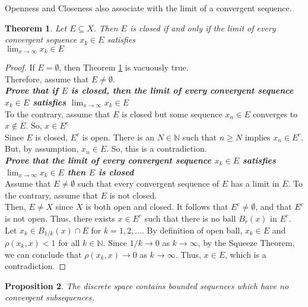 \documentclass[12pt, reqno]{amsart}
\newtheorem{theorem}{Theorem}[section]
\newtheorem{proposition}[theorem]{Proposition}
\theoremstyle{definition}
\numberwithin{equation}{section}
\newcommand{\dN}{{\mathbb N}}
\newcommand{\tab}{\hspace{1cm}}
\begin{document}
Openness and Closeness also associate with the limit of a convergent sequence.
\begin{theorem} \cite{s1}
    Let $E \subseteq X$. Then $E$ is closed if and only if the limit of every convergent sequence $x_k \in E$ satisfies\\
    \hspace*{5cm} $\lim_{x \to \infty} x_k \in E$ \label{limit_theorem}
\end{theorem}
\begin{proof}
    If $E = \emptyset$, then Theorem \ref{limit_theorem} is vacuously true.\\
    Therefore, assume that $E \neq \emptyset$.\\
    \textbf{ \textit{Prove that if $E$ is closed, then the limit of every convergent sequence $x_k \in E$ satisfies $\lim_{x \to \infty} x_k \in E$}}\\
    \tab To the contrary, assume that $E$ is closed but some sequence $x_n \in E$ converges to $x \notin E$. So, $x \in E^c$\\
    \tab Since $E$ is closed, $E^c$ is open. There is an $N \in \dN$ such that $n \geq N$ implies $x_n \in E^c$. But, by assumption, $x_n \in E$. So, this is a contradiction.\\
    \textbf{ \textit{Prove that the limit of every convergent sequence $x_k \in E$ satisfies $\lim_{x \to \infty} x_k \in E$ then $E$ is closed}}\\
    \tab Assume that $E \neq \emptyset$ such that every convergent sequence of $E$ has a limit in $E$. To the contrary, assume that $E$ is not closed.\\
    Then, $E \neq X$ since $X$ is both open and closed. It follows that $E^c \neq \emptyset$, and that $E^c$ is not open. Thus, there exists $x \in E^c$ such that there is no ball $B_r(x)$ in $E^c$.\\
    Let $x_k \in B_{1/k}(x) \cap E$ for $k = 1,2,...$. By definition of open ball, $x_k \in E$ and $\rho(x_k,x)<1$ for all $k \in \dN$. Since ${1/k} \rightarrow 0$ as $k \rightarrow \infty$, by the Squeeze Theorem, we can conclude that $\rho(x_k, x) \rightarrow 0$ as $k \rightarrow \infty$. Thus, $x \in E$, which is a contradiction.
\end{proof}
\begin{proposition}\cite{s1}
The discrete space contains bounded sequences which have no convergent subsequences.
\end{proposition}
\end{document}
